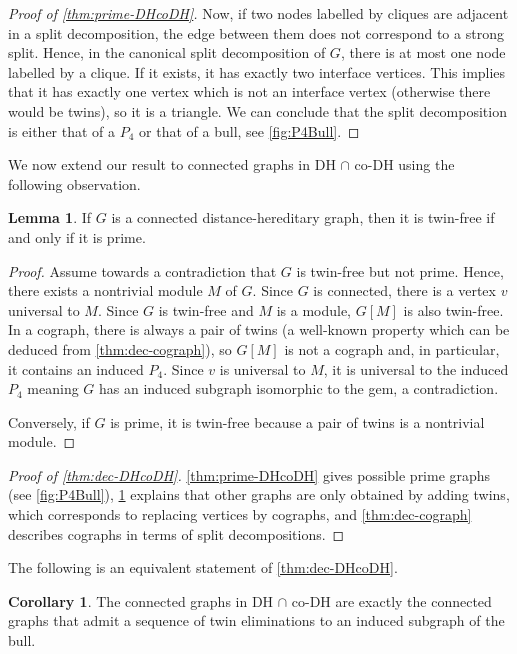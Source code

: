 \documentclass{amsart}
\def\DHcoDH{DH $\cap$ co-DH}
\theoremstyle{definition}
\newtheorem{lemma}{Lemma}
\newtheorem{corollary}{Corollary}
\begin{document}
\begin{proof}[Proof of \cref{thm:prime-DHcoDH}]
	Now, if two nodes labelled by cliques are adjacent in a split
	decomposition, the edge between them does not correspond to a strong split.
	Hence, in the canonical split decomposition of $G$, there is at most one
	node labelled by a clique. If it exists, it has exactly two interface
	vertices. This implies that it has exactly one vertex which is not an
	interface vertex (otherwise there would be twins), so it is a triangle. We
	can conclude that the split decomposition is either that of a $P_4$ or that
	of a bull, see \cref{fig:P4Bull}.
\end{proof}

We now extend our result to connected graphs in \DHcoDH{} using the
following observation.

\begin{lemma}\label{lem:twin-free-connected-DH}
	If $G$ is a connected distance-hereditary graph, then it is twin-free if
	and only if it is prime.
\end{lemma}

\begin{proof}
	Assume towards a contradiction that $G$ is twin-free but not prime. Hence,
	there exists a nontrivial module $M$ of $G$.
	Since $G$ is connected, there is a vertex $v$ universal to $M$. Since $G$
	is twin-free and $M$ is a module, $G[M]$ is also twin-free. In a cograph,
	there is always a pair of twins (a well-known property which can be deduced
	from \cref{thm:dec-cograph}), so
	$G[M]$ is not a cograph and, in particular, it contains an induced $P_4$.
	Since $v$ is universal to $M$, it is universal to the induced $P_4$ meaning
	$G$ has an induced subgraph isomorphic to the gem, a contradiction.

	Conversely, if $G$ is prime, it is twin-free because a pair of twins is a
	nontrivial module.
\end{proof}

\begin{proof}[Proof of \cref{thm:dec-DHcoDH}]
\cref{thm:prime-DHcoDH} gives possible prime graphs (see \cref{fig:P4Bull}),
\cref{lem:twin-free-connected-DH} explains that other graphs are only obtained
by adding twins, which corresponds to replacing vertices by cographs, and
\cref{thm:dec-cograph} describes cographs in terms of split decompositions.
\end{proof}

The following is an equivalent statement of \cref{thm:dec-DHcoDH}.

\begin{corollary}
	The connected graphs in \DHcoDH{} are exactly the connected graphs that admit a
	sequence of twin eliminations to an induced subgraph of the bull.
\end{corollary}
\end{document}
